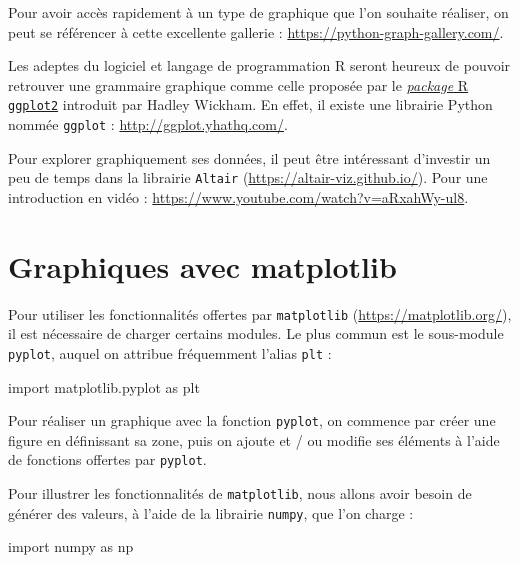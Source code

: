 \documentclass[
  12pt,
]{book}
\newenvironment{Shaded}{\begin{snugshade}}{\end{snugshade}}
\newcommand{\ImportTok}[1]{#1}
\newcommand{\NormalTok}[1]{#1}
\numberwithin{equation}{section}
\numberwithin{countremarque}{section}
\begin{document}
Pour avoir accès rapidement à un type de graphique que l'on souhaite réaliser, on peut se référencer à cette excellente gallerie : \url{https://python-graph-gallery.com/}.

Les adeptes du logiciel et langage de programmation R seront heureux de pouvoir retrouver une grammaire graphique comme celle proposée par le \href{https://ggplot2.tidyverse.org/}{\emph{package} R \texttt{ggplot2}} introduit par Hadley Wickham. En effet, il existe une librairie Python nommée \texttt{ggplot} : \url{http://ggplot.yhathq.com/}.

Pour explorer graphiquement ses données, il peut être intéressant d'investir un peu de temps dans la librairie \texttt{Altair} (\url{https://altair-viz.github.io/}). Pour une introduction en vidéo : \url{https://www.youtube.com/watch?v=aRxahWy-ul8}.

\section{Graphiques avec matplotlib}\label{graphiques-avec-matplotlib}

Pour utiliser les fonctionnalités offertes par \texttt{matplotlib} (\url{https://matplotlib.org/}), il est nécessaire de charger certains modules. Le plus commun est le sous-module \texttt{pyplot}, auquel on attribue fréquemment l'alias \texttt{plt} :

\begin{Shaded}
\begin{Highlighting}[]
\ImportTok{import}\NormalTok{ matplotlib.pyplot }\ImportTok{as}\NormalTok{ plt}
\end{Highlighting}
\end{Shaded}

Pour réaliser un graphique avec la fonction \texttt{pyplot}, on commence par créer une figure en définissant sa zone, puis on ajoute et / ou modifie ses éléments à l'aide de fonctions offertes par \texttt{pyplot}.

Pour illustrer les fonctionnalités de \texttt{matplotlib}, nous allons avoir besoin de générer des valeurs, à l'aide de la librairie \texttt{numpy}, que l'on charge :

\begin{Shaded}
\begin{Highlighting}[]
\ImportTok{import}\NormalTok{ numpy }\ImportTok{as}\NormalTok{ np}
\end{Highlighting}
\end{Shaded}
\end{document}
